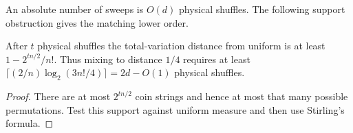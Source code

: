 An absolute number of sweeps is $O(d)$ physical shuffles. The following support obstruction gives the matching lower order.

\begin{proposition}\label{ten:support}
After $t$ physical shuffles the total-variation distance from uniform is at least $1-2^{tn/2}/n!$. Thus mixing to distance $1/4$ requires at least $\lceil(2/n)\log_2(3n!/4)\rceil=2d-O(1)$ physical shuffles.
\end{proposition}
\begin{proof}
There are at most $2^{tn/2}$ coin strings and hence at most that many possible permutations. Test this support against uniform measure and then use Stirling's formula.
\end{proof}
